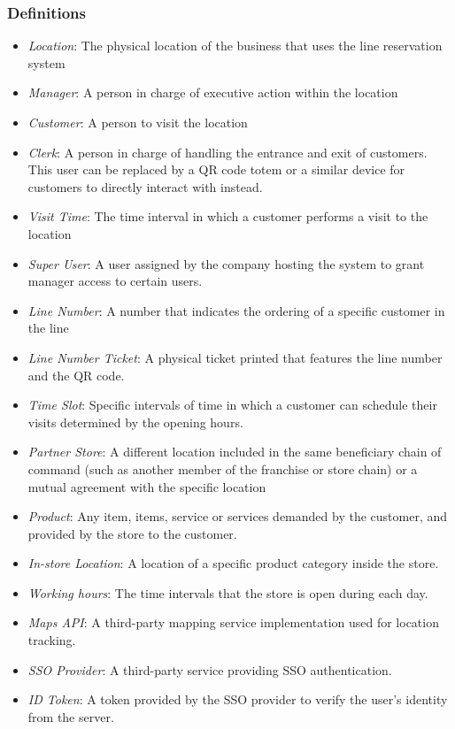 \subsubsection{Definitions}
\begin{itemize}
    \item \textit{Location}: The physical location of the business that uses the line reservation system
    \item \textit{Manager}: A person in charge of executive action within the location
    \item \textit{Customer}: A person to visit the location
    \item \textit{Clerk}: A person in charge of handling the entrance and exit of customers. This user can be replaced by a QR code totem or a similar device for customers to directly interact with instead.
    \item \textit{Visit Time}: The time interval in which a customer performs a visit to the location
    \item \textit{Super User}: A user assigned by the company hosting the system to grant manager access to certain users.
    \item \textit{Line Number}: A number that indicates the ordering of a specific customer in the line %
    \item \textit{Line Number Ticket}: A physical ticket printed that features the line number and the QR code.
    \item \textit{Time Slot}: Specific intervals of time in which a customer can schedule their visits determined by the opening hours.
    \item \textit{Partner Store}: A different location included in the same beneficiary chain of command (such as another member of the franchise or store chain) or a mutual agreement with the specific location
    \item \textit{Product}: Any item, items, service or services demanded by the customer, and provided by the store to the customer.
    \item \textit{In-store Location}: A location of a specific product category inside the store.
    \item \textit{Working hours}: The time intervals that the store is open during each day.
    \item \textit{Maps API}: A third-party mapping service implementation used for location tracking.
    \item \textit{SSO Provider}: A third-party service providing SSO authentication.
    \item \textit{ID Token}: A token provided by the SSO provider to verify the user's identity from the server.
\end{itemize}
